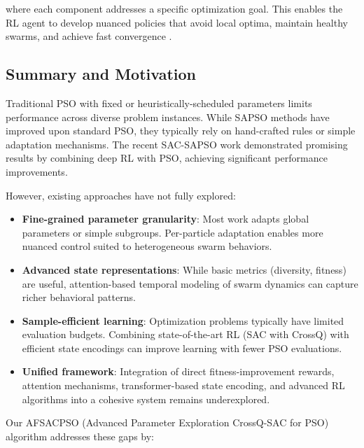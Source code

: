 where each component addresses a specific optimization goal. This enables the RL agent to develop nuanced policies that avoid local optima, maintain healthy swarms, and achieve fast convergence \cite{Pitis2019}.

\subsection*{Summary and Motivation}
\label{subsec:summary_motivation}

Traditional PSO with fixed or heuristically-scheduled parameters limits performance across diverse problem instances. While SAPSO methods have improved upon standard PSO, they typically rely on hand-crafted rules or simple adaptation mechanisms. The recent SAC-SAPSO work \cite{VonEschwege2024} demonstrated promising results by combining deep RL with PSO, achieving significant performance improvements.

However, existing approaches have not fully explored:

\begin{itemize}
\item \textbf{Fine-grained parameter granularity}: Most work adapts global parameters or simple subgroups. Per-particle adaptation enables more nuanced control suited to heterogeneous swarm behaviors.
\item \textbf{Advanced state representations}: While basic metrics (diversity, fitness) are useful, attention-based temporal modeling of swarm dynamics can capture richer behavioral patterns.
\item \textbf{Sample-efficient learning}: Optimization problems typically have limited evaluation budgets. Combining state-of-the-art RL (SAC with CrossQ) with efficient state encodings can improve learning with fewer PSO evaluations.
\item \textbf{Unified framework}: Integration of direct fitness-improvement rewards, attention mechanisms, transformer-based state encoding, and advanced RL algorithms into a cohesive system remains underexplored.
\end{itemize}

Our AFSACPSO (Advanced Parameter Exploration CrossQ-SAC for PSO) algorithm addresses these gaps by:

